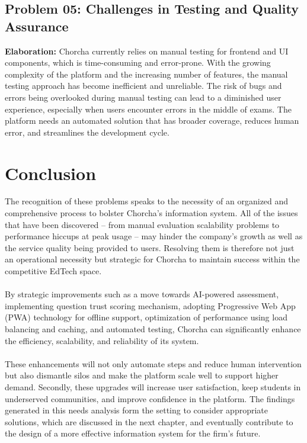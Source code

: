 \documentclass[12pt,a4paper,oneside]{book}
\begin{document}
\subsection{Problem 05: Challenges in Testing and Quality Assurance}
\textbf{Elaboration:} Chorcha currently relies on manual testing for frontend and UI components, which is time-consuming and error-prone. With the growing complexity of the platform and the increasing number of features, the manual testing approach has become inefficient and unreliable. The risk of bugs and errors being overlooked during manual testing can lead to a diminished user experience, especially when users encounter errors in the middle of exams. The platform needs an automated solution that has broader coverage, reduces human error, and streamlines the development cycle.

\section{Conclusion}
The recognition of these problems speaks to the necessity of an organized and comprehensive process to bolster Chorcha's information system. All of the issues that have been discovered – from manual evaluation scalability problems to performance hiccups at peak usage – may hinder the company's growth as well as the service quality being provided to users. Resolving them is therefore not just an operational necessity but strategic for Chorcha to maintain success within the competitive EdTech space.
\\ \\By strategic improvements such as a move towards AI-powered assessment, implementing question trust scoring mechanism, adopting Progressive Web App (PWA) technology for offline support, optimization of performance using load balancing and caching, and automated testing, Chorcha can significantly enhance the efficiency, scalability, and reliability of its system.
\\ \\These enhancements will not only automate steps and reduce human intervention but also dismantle silos and make the platform scale well to support higher demand. Secondly, these upgrades will increase user satisfaction, keep students in underserved communities, and improve confidence in the platform. The findings generated in this needs analysis form the setting to consider appropriate solutions, which are discussed in the next chapter, and eventually contribute to the design of a more effective information system for the firm's future.
\end{document}
